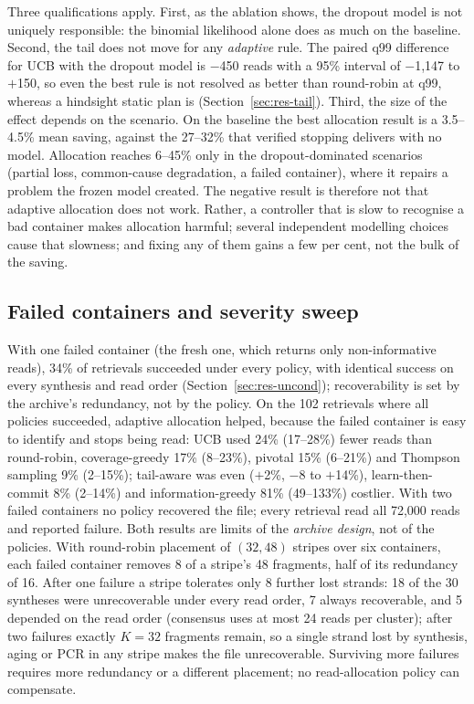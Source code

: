 \documentclass[conference,onecolumn,11pt]{IEEEtran}
\begin{document}
Three qualifications apply.  First, as the ablation shows, the dropout model is not uniquely
responsible: the binomial likelihood alone does as much on the baseline.  Second, the tail does not move
for any \emph{adaptive} rule.  The paired q99 difference for UCB with the dropout model is $-$450 reads
with a 95\% interval of $-$1{,}147 to $+$150, so even the best rule is not resolved as better than
round-robin at q99, whereas a hindsight static plan is (Section~\ref{sec:res-tail}).  Third, the size of
the effect depends on the scenario.  On the baseline the best allocation result is a 3.5--4.5\% mean
saving, against the 27--32\% that verified stopping delivers with no model.  Allocation reaches
6--45\% only in the dropout-dominated scenarios (partial loss, common-cause degradation, a failed
container), where it repairs a problem the frozen model created.  The negative result is therefore not
that adaptive allocation does not work.  Rather, a controller that is slow to recognise a bad container
makes allocation harmful; several independent modelling choices cause that slowness; and fixing any of
them gains a few per cent, not the bulk of the saving.


\subsection{Failed containers and severity sweep}\label{sec:res-fail}
With one failed container (the fresh one, which returns only non-informative reads), 34\% of
retrievals succeeded under every policy, with identical success on every synthesis and read order
(Section~\ref{sec:res-uncond}); recoverability is set by the archive's redundancy, not by the policy.
On the 102 retrievals where all policies succeeded, adaptive allocation helped, because the failed
container is easy to identify and stops being read: UCB used 24\% (17--28\%) fewer reads than round-robin,
coverage-greedy 17\% (8--23\%), pivotal 15\% (6--21\%) and Thompson sampling 9\% (2--15\%);
tail-aware was even ($+$2\%, $-$8 to $+$14\%), learn-then-commit 8\% (2--14\%) and information-greedy
81\% (49--133\%) costlier.  With two failed containers no policy recovered the file; every
retrieval read all 72{,}000 reads and reported failure.  Both results are limits of the
\emph{archive design}, not of the policies.  With round-robin placement of $(32,48)$ stripes over six
containers, each failed container removes 8 of a stripe's 48 fragments, half of its redundancy of 16.
After one failure a stripe tolerates only 8 further lost strands: 18 of the 30 syntheses were
unrecoverable under every read order, 7 always recoverable, and 5 depended on the read order
(consensus uses at most 24 reads per cluster); after two failures exactly $K{=}32$ fragments remain, so a single strand lost by
synthesis, aging or PCR in any stripe makes the file unrecoverable.  Surviving more failures requires more redundancy or a different placement;
no read-allocation policy can compensate.
\end{document}
